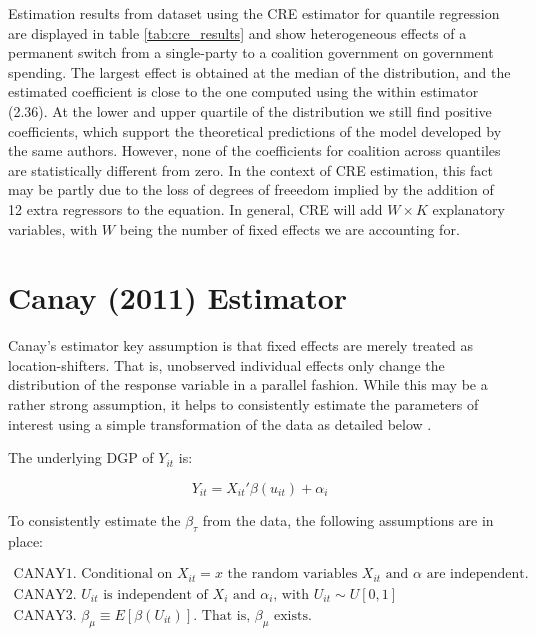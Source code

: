 \documentclass{article}
\begin{document}
Estimation results from \cite{persson2007} dataset using the CRE estimator for quantile regression are displayed in table \ref{tab:cre_results} and show heterogeneous effects of a permanent switch from a single-party to a coalition government on government spending. The largest effect is obtained at the median of the distribution, and the estimated coefficient is close to the one \cite{persson2007} computed using the within estimator (2.36). At the lower and upper quartile of the distribution we still find positive coefficients, which support the theoretical predictions of the model developed by the same authors. However, none of the coefficients for coalition across quantiles are statistically different from zero. In the context of CRE estimation, this fact may be partly due to the loss of degrees of freeedom implied by the addition of 12 extra regressors to the equation. In general, CRE will add $W \times K$ explanatory variables, with $W$ being the number of fixed effects we are accounting for.

\section{Canay (2011) Estimator}\label{sec:canay}

Canay's estimator key assumption is that fixed effects are merely treated as location-shifters. That is, unobserved individual effects only change the distribution of the response variable in a parallel fashion. While this may be a rather strong assumption, it helps to consistently estimate the parameters of interest using a simple transformation of the data as detailed below \cite{canay2011}. 

The underlying DGP of $Y_{it}$ is:

\begin{equation}\label{eq:dgp_canay}
    Y_{it} = X_{it}' \beta(u_{it}) + \alpha_i
\end{equation}

To consistently estimate the $\beta_{\tau}$ from the data, the following assumptions are in place:

\begin{gather}
    \text{CANAY1. Conditional on $X_{it} = x$ the random variables $X_{it}$ and $\alpha$ are independent.} \\
    \text{CANAY2. $U_{it}$ is independent of $X_i$ and $\alpha_i$, with $U_{it} \sim U[0,1]$} \\
    \text{CANAY3. $\beta_{\mu} \equiv E[\beta(U_{it})]$. That is, $\beta_{\mu}$ exists.}
\end{gather}
\end{document}
